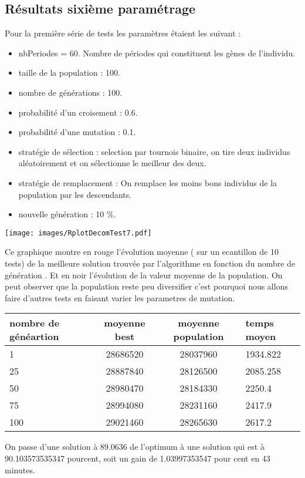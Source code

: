 \documentclass[a4paper]{report}
\begin{document}
\subsection{Résultats sixième paramétrage}
Pour la première série de tests les paramètres étaient les suivant :\\

\begin{itemize}
\item nbPeriodes = 60. Nombre de périodes qui constituent les gènes de l'individu.
\item taille de la population : 100.
\item nombre de générations : 100.
\item probabilité d'un croisement : 0.6.
\item probabilité d'une mutation : 0.1.
\item stratégie de sélection : selection par tournois binaire, on tire deux individus aléatoirement et on sélectionne le meilleur des deux.
\item stratégie de remplacement : On remplace les moins bons individus de la population par les descendants.
\item nouvelle génération : 10 $\%$.

\end{itemize}
\begin{center}
\texttt{[image: images/RplotDecomTest7.pdf]}
\end{center}
Ce graphique montre  en rouge l'évolution moyenne ( sur un ecantillon de 10 tests) de la  meilleure solution trouvée par l'algorithme en fonction du nombre de génération . Et en noir l'évolution de la valeur moyenne de la population. On peut observer que la population reste peu diversifier c'est pourquoi nous allons faire d'autres tests en faisant varier les parametres de mutation.\\
\begin{tabular}{|l|c|c|l|}
  \hline
  nombre de généartion &moyenne best &moyenne population&temps moyen\\

  \hline
 1 &28686520&28037960&1934.822\\
  \hline
25 & 28887840&  28126500& 2085.258
\\
  \hline
  50&  28980470&28184330&2250.4
\\
  \hline
  75 &28994080& 28231160&2417.9


\\
  \hline
 100 &  29021460&28265630& 2617.2 \\
  \hline


\end{tabular}
On passe d'une solution à 89.0636 de l'optimum à une solution qui est à 90.103573535347 pourcent, soit un gain de 1.03997353547 pour cent en 43 minutes.
\end{document}

